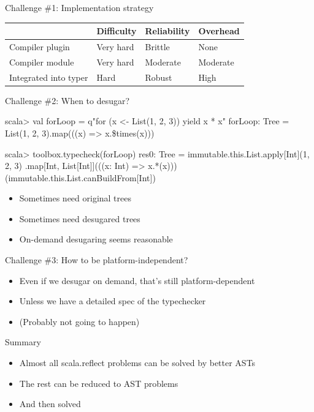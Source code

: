 \documentclass[svgnames,dvipsnames,hyperref={bookmarks=false},usepdftitle=false]{beamer}
\begin{document}
\begin{frame}{Challenge \#1: Implementation strategy}
\begin{tabular}{ | l | l | l | l | }
  \hline
  & Difficulty & Reliability & Overhead \\ \hline
  Compiler plugin & Very hard & Brittle & None \\ \hline
  Compiler module & Very hard & Moderate & Moderate \\ \hline
  Integrated into typer & Hard & Robust & High \\
  \hline
\end{tabular}
\end{frame}

\begin{frame}[fragile]{Challenge \#2: When to desugar?}
\begin{semiverbatim}
scala> val forLoop = q"for (x <- List(1, 2, 3)) yield x * x"
forLoop: Tree = List(1, 2, 3).map(((x) => x.\$times(x)))

scala> toolbox.typecheck(forLoop)
res0: Tree = immutable.this.List.apply[Int](1, 2, 3)
.map[Int, List[Int]](((x: Int) => x.*(x)))
(immutable.this.List.canBuildFrom[Int])

\end{semiverbatim}

\begin{itemize}
\item Sometimes need original trees
\item Sometimes need desugared trees
\item On-demand desugaring seems reasonable
\end{itemize}
\end{frame}

\begin{frame}{Challenge \#3: How to be platform-independent?}
\begin{itemize}
\item Even if we desugar on demand, that's still platform-dependent
\item Unless we have a detailed spec of the typechecker
\item (Probably not going to happen)
\end{itemize}
\end{frame}


\begin{frame}{Summary}
\begin{itemize}
\item Almost all scala.reflect problems can be solved by better ASTs
\item<2-> The rest can be reduced to AST problems
\item<3-> And then solved
\end{itemize}
\end{frame}
\end{document}
